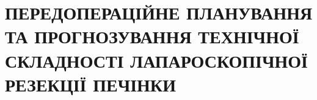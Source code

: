 \chapter{ПЕРЕДОПЕРАЦІЙНЕ ПЛАНУВАННЯ ТА ПРОГНОЗУВАННЯ ТЕХНІЧНОЇ СКЛАДНОСТІ ЛАПАРОСКОПІЧНОЇ РЕЗЕКЦІЇ ПЕЧІНКИ}
